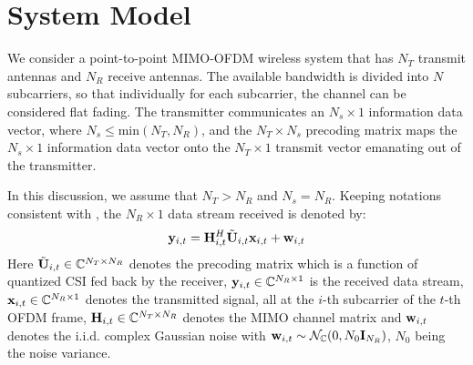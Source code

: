 \documentclass[conference]{IEEEtran}
\begin{document}
% 

\section{System Model}
\label{section2}
\noindent We consider a point-to-point MIMO-OFDM wireless system that
has $N_T$ transmit antennas and $N_R$ receive antennas. 
The available bandwidth is divided into $N$ subcarriers, so that individually for each subcarrier, the channel can be considered flat fading. 
The transmitter communicates an $N_s \times 1$ information data vector, where
$N_s \leq \text{min}(N_T,N_R)$, and the $N_T \times N_s$ precoding
matrix maps the $N_s \times 1$ information data vector onto the $N_T \times 1$ transmit vector emanating out of the transmitter.

In this discussion, we assume that $N_T > N_R$ and $N_s = N_R$. Keeping notations consistent with \cite{6891198,Gupt1905:Predictive}, the $N_R \times 1$ data stream received is denoted by:
\begin{equation}
{\bf y}_{i,t}={\bf H}^{H}_{i,t}\tilde{{\bf U}}_{i,t}{\bf x}_{i,t}+ {\bf w}_{i,t}
\end{equation}
Here $\tilde{{\bf U}}_{i,t} \in \mathbb{C}^{N_T \times N_R}$ denotes the precoding matrix which is a function of quantized CSI fed back by the receiver, ${\bf y}_{i,t} \in \mathbb{C}^{N_R \times 1}$ is the received data stream, ${\bf x}_{i,t} \in \mathbb{C}^{N_R \times 1}$ denotes the transmitted signal, all at the $i$-th subcarrier of the $t$-th OFDM frame, ${\bf H}_{i,t} \in \mathbb{C}^{N_T \times N_R}$ denotes the MIMO channel matrix and ${\bf w}_{i,t}$ denotes the i.i.d. complex Gaussian noise with ${\bf w}_{i,t} \sim \mathcal{N}_{\mathbb{C}}(0,N_0{\bf I}_{N_R})$, $N_0$ being the noise variance.

\end{document}
